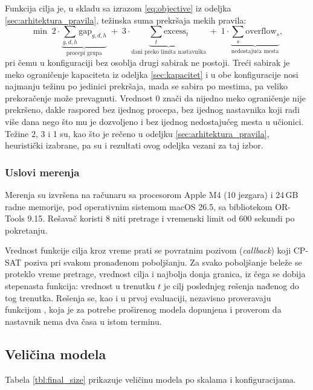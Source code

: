 \documentclass[12pt,oneside]{memoir}
\begin{document}
Funkcija cilja je, u skladu sa izrazom \eqref{eq:objective} iz odeljka
\ref{sec:arhitektura_pravila}, težinska suma prekršaja mekih pravila:
\[
  \min \; 2 \cdot \underbrace{\sum_{g,d,h} \text{gap}_{g,d,h}}_{\text{procepi grupa}}
  \;+\; 3 \cdot \underbrace{\sum_{t} \text{excess}_{t}}_{\text{dani preko limita nastavnika}}
  \;+\; 1 \cdot \underbrace{\sum_{s} \text{overflow}_{s}}_{\text{nedostajuća mesta}},
\]
pri čemu u konfiguraciji bez osoblja drugi sabirak ne postoji. Treći
sabirak je meko ograničenje kapaciteta iz odeljka \ref{sec:kapacitet} i
u obe konfiguracije nosi najmanju težinu po jedinici prekršaja, mada se
sabira po mestima, pa veliko prekoračenje može prevagnuti. Vrednost 0
znači da nijedno meko ograničenje nije prekršeno, dakle raspored bez
ijednog procepa, bez ijednog nastavnika koji radi više dana nego što mu
je dozvoljeno i bez ijednog nedostajućeg mesta u učionici. Težine 2, 3
i 1 su, kao što je rečeno u odeljku \ref{sec:arhitektura_pravila},
heuristički izabrane, pa su i rezultati ovog odeljka vezani za taj
izbor.

\subsubsection{Uslovi merenja}

Merenja su izvršena na računaru sa procesorom Apple M4 (10 jezgara) i
24\,GB radne memorije, pod operativnim sistemom macOS 26.5, sa
bibliotekom OR-Tools 9.15. Rešavač koristi 8 niti pretrage i vremenski
limit od 600 sekundi po pokretanju.

Vrednost funkcije cilja kroz vreme prati se povratnim pozivom
(\emph{callback}) koji CP-SAT poziva pri svakom pronađenom poboljšanju.
Za svako poboljšanje beleže se proteklo vreme pretrage, vrednost cilja i
najbolja donja granica, iz čega se dobija stepenasta funkcija: vrednost
u trenutku $t$ je cilj poslednjeg rešenja nađenog do tog trenutka.
Rešenja se, kao i u prvoj evaluaciji, nezavisno proveravaju funkcijom
, koja je za potrebe proširenog modela dopunjena
i proverom da nastavnik nema dva časa u istom terminu.

\subsection{Veličina modela}
\label{sec:finalna_velicina}

Tabela \ref{tbl:final_size} prikazuje veličinu modela po skalama i
konfiguracijama.
\end{document}
